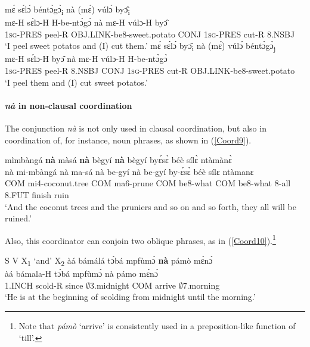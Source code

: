 \begin{exe} 
\ex\label{Coordobjb} 
\begin{xlist}
\ex\label{Coordobj4}
\glll mɛ́ sɛ́lɔ́ béntɔ̀gɔ̀\textsubscript{i} nà (mɛ́) vúlɔ́ byɔ̂\textsubscript{i} \\
mɛ-H sɛ́lɔ-H H-be-ntɔ̀gɔ̀ nà mɛ-H vúlɔ-H byɔ̂ \\
1\textsc{sg}-PRES peel-R OBJ.LINK-be8-sweet.potato CONJ 1\textsc{sg}-PRES cut-R 8.NSBJ \\
\trans `I peel sweet potatos and (I) cut them.'
\ex\label{Coordobj5}
\glll mɛ́ sɛ́lɔ́ byɔ̂\textsubscript{i} nà (mɛ́) vúlɔ́  béntɔ̀gɔ̀\textsubscript{j} \\
mɛ-H sɛ́lɔ-H  byɔ̂  nà mɛ-H vúlɔ-H H-be-ntɔ̀gɔ̀ \\
 1\textsc{sg}-PRES peel-R 8.NSBJ CONJ 1\textsc{sg}-PRES cut-R OBJ.LINK-be8-sweet.potato  \\
\trans `I peel them and (I) cut sweet potatos.'
\end{xlist}
\end{exe}



\paragraph{{\itshape nà} in non-clausal coordination}
The conjunction {\itshape nà} is not only used in clausal coordination, but also in coordination of, for instance, noun phrases, as shown in (\ref{Coord9}).


\begin{exe} 
\ex\label{Coord9}
   mìmbàngá {\bfseries nà} màsá {\bfseries nà} bègyí {\bfseries nà} bègyí byɛ́sɛ̀ béè sílɛ̀ ntàmànɛ̀ \\
       nà mi-mbàngá nà ma-sá nà be-gyí nà be-gyí by-ɛ́sɛ̀ béè sílɛ ntàmanɛ \\
           COM mi4-coconut.tree COM ma6-prune COM be8-what COM be8-what 8-all 8.FUT finish ruin\\
    \trans `And the coconut trees and the pruniers and so on and so forth, they all will be ruined.'
\end{exe}

\noindent Also, this coordinator can conjoin two oblique phrases, as in (\ref{Coord10}).\footnote{Note that {\itshape pámò} `arrive' is consistently used in a preposition-like function of `till'.}

\begin{exe} 
\ex\label{Coord10} S V X\textsubscript{1} `and' X\textsubscript{2}
  \glll àá bámálá tɔ́bá mpfùmɔ̀ {\bfseries nà} pámò mɛ́nɔ́ \\
       àá bámala-H tɔ́bá mpfùmɔ̀ nà pámo mɛ́nɔ́ \\
       1.INCH scold-R since  $\emptyset$3.midnight COM arrive $\emptyset$7.morning \\
    \trans `He is at the beginning of scolding from midnight until the morning.'
\end{exe}

